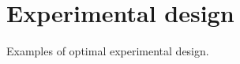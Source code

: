 
\section{Experimental design}

\begin{frame}

	Examples of optimal experimental design.

\end{frame}


